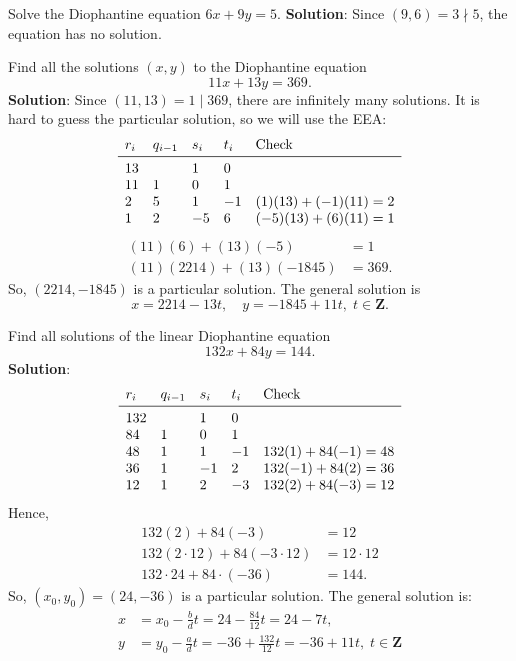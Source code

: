 \begin{Example}{}{}
    Solve the Diophantine equation $ 6x+9y=5 $.
    \tcblower{}
    \textbf{Solution}: Since $ (9,6)=3\nmid 5 $, the equation has no solution.
\end{Example}
\begin{Example}{}{}
    Find all the solutions $ (x,y) $ to the Diophantine equation
    \[ 11x+13y=369. \]
    \tcblower{}
    \textbf{Solution}: Since $ (11,13)=1\mid 369 $, there are infinitely many solutions. It is hard to guess
    the particular solution, so we will use the EEA\@:
    \[ \begin{array}{lllll}
            r_i & q_{i-1} & s_i & t_i & \text{Check}       \\
            \midrule
            13  &         & 1   & 0                        \\
            11  & 1       & 0   & 1                        \\
            2   & 5       & 1   & -1  & (1)(13)+(-1)(11)=2 \\
            1   & 2       & -5  & 6   & (-5)(13)+(6)(11)=1
        \end{array} \]
    \begin{align*}
        (11)(6)+(13)(-5)       & =1    \\
        (11)(2214)+(13)(-1845) & =369.
    \end{align*}
    So, $ (2214,-1845) $ is a particular solution. The general solution is
    \[ x=2214-13t,\quad y=-1845+11t,\; t\in\mathbf{Z}. \]
\end{Example}
\begin{Exercise}{}{}
    Find all solutions of the linear Diophantine equation
    \[ 132x+84y=144. \]
    \tcblower{}
    \textbf{Solution}:
    \[ \begin{array}{lllll}
            r_i & q_{i-1} & s_i & t_i & \text{Check}     \\
            \midrule
            132 &         & 1   & 0                      \\
            84  & 1       & 0   & 1                      \\
            48  & 1       & 1   & -1  & 132(1)+84(-1)=48 \\
            36  & 1       & -1  & 2   & 132(-1)+84(2)=36 \\
            12  & 1       & 2   & -3  & 132(2)+84(-3)=12
        \end{array} \]
    Hence,
    \begin{align*}
        132(2)+84(-3)                 & =12         \\
        132(2\cdot 12)+84(-3\cdot 12) & =12\cdot 12 \\
        132\cdot 24+84\cdot (-36)     & =144.
    \end{align*}
    So, $ (x_0,y_0)=(24,-36) $ is a particular solution. The general solution is:
    \begin{align*}
        x & =x_0-\frac{b}{d}t=24-\frac{84}{12}t=24-7t,                      \\
        y & =y_0-\frac{a}{d}t=-36+\frac{132}{12}t=-36+11t,\; t\in\mathbf{Z}
    \end{align*}
\end{Exercise}
